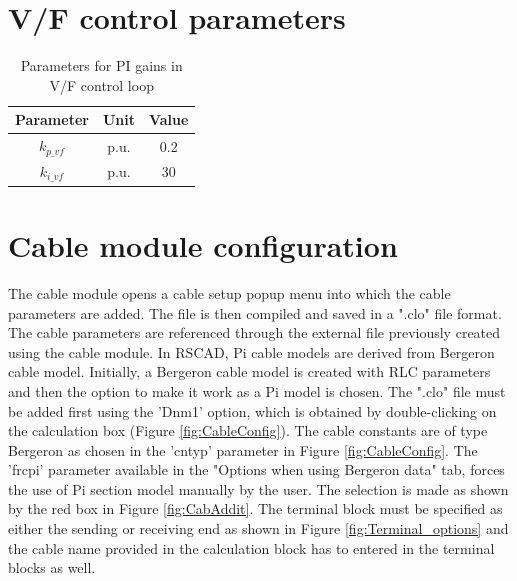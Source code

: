 \section{V/F control parameters}
\begin{table}[H]
\centering
\begin{tabular}{|c|c|c|}
\hline
\textbf{Parameter}  & \textbf{Unit}
& \textbf{Value} \\ \hline
$k_{p\_vf}$     & p.u. & 0.2 \\ \hline
$k_{i\_vf}$     & p.u. & 30 \\ \hline
\end{tabular}
\caption{Parameters for PI gains in V/F control loop \cite{vrana2013cigre}}
\label{tab:U_F_para}
\end{table}





\section{Cable module configuration}\label{config_cable}
The cable module opens a cable setup popup menu into which the cable parameters are added. The file is then compiled and saved in a ".clo" file format. The cable parameters are referenced through the external file previously created using the cable module. In RSCAD, Pi cable models are derived from Bergeron cable model. Initially, a Bergeron cable model is created with RLC parameters and then the option to make it work as a Pi model is chosen. The ".clo" file must be added first using the 'Dnm1' option, which is obtained by double-clicking on the calculation box (Figure \ref{fig:CableConfig}). The cable constants are of type Bergeron as chosen in the 'cntyp' parameter in Figure \ref{fig:CableConfig}. The 'frcpi' parameter available in the "Options when using Bergeron data" tab, forces the use of Pi section model manually by the user. The selection is made as shown by the red box in Figure \ref{fig:CabAddit}. The terminal block must be specified as either the sending or receiving end as shown in Figure \ref{fig:Terminal_options} and the cable name provided in the calculation block has to entered in the terminal blocks as well.\\

